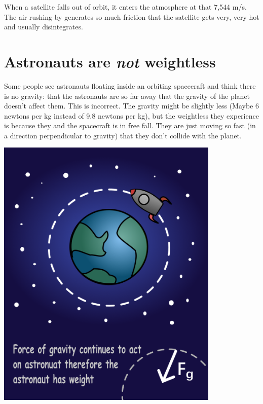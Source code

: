 When a satellite falls out of orbit, it enters the atmosphere at that
7,544 m/s.  The air rushing by generates so much friction that the
satellite gets very, very hot and usually disintegrates.

\section{Astronauts are \emph{not} weightless}

Some people see astronauts floating inside an orbiting spacecraft and
think there is no gravity: that the astronauts are so far away that
the gravity of the planet doesn't affect them. This is incorrect.  The
gravity might be slightly less (Maybe 6 newtons per kg instead of 9.8
newtons per kg), but the weightless they experience is because they
and the spacecraft is in free fall.  They are just moving so fast (in
a direction perpendicular to gravity) that they don't collide with the
planet.

\includegraphics[width=0.8\textwidth]{orbit_2.png}


